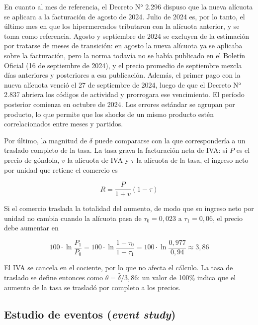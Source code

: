 En cuanto al mes de referencia, el Decreto N° 2.296 dispuso que la nueva alícuota se aplicara a la facturación de agosto de 2024. Julio de 2024 es, por lo tanto, el último mes en que los hipermercados tributaron con la alícuota anterior, y se toma como referencia. Agosto y septiembre de 2024 se excluyen de la estimación por tratarse de meses de transición: en agosto la nueva alícuota ya se aplicaba sobre la facturación, pero la norma todavía no se había publicado en el Boletín Oficial (16 de septiembre de 2024), y el precio promedio de septiembre mezcla días anteriores y posteriores a esa publicación. Además, el primer pago con la nueva alícuota venció el 27 de septiembre de 2024, luego de que el Decreto N° 2.837 abriera los códigos de actividad y prorrogara ese vencimiento. El período posterior comienza en octubre de 2024. Los errores estándar se agrupan por producto, lo que permite que los shocks de un mismo producto estén correlacionados entre meses y partidos.

Por último, la magnitud de \(\delta\) puede compararse con la que correspondería a un traslado completo de la tasa. La tasa grava la facturación neta de IVA: si \(P\) es el precio de góndola, \(v\) la alícuota de IVA y \(\tau\) la alícuota de la tasa, el ingreso neto por unidad que retiene el comercio es

\begin{equation}\label{eq:4}
  R = \frac{P}{1 + v}(1 - \tau)
\end{equation}

Si el comercio traslada la totalidad del aumento, de modo que su ingreso neto por unidad no cambia cuando la alícuota pasa de \(\tau_{0} = 0{,}023\) a \(\tau_{1} = 0{,}06\), el precio debe aumentar en

\begin{equation}\label{eq:5}
  100 \cdot \ln\frac{P_{1}}{P_{0}} = 100 \cdot \ln\frac{1 - \tau_{0}}{1 - \tau_{1}} = 100 \cdot \ln\frac{0{,}977}{0{,}94} \approx 3{,}86
\end{equation}

El IVA se cancela en el cociente, por lo que no afecta el cálculo. La tasa de traslado se define entonces como \(\theta = \widehat{\delta}/3{,}86\): un valor de 100\% indica que el aumento de la tasa se trasladó por completo a los precios.

\subsection{Estudio de eventos (\textit{event study})}

